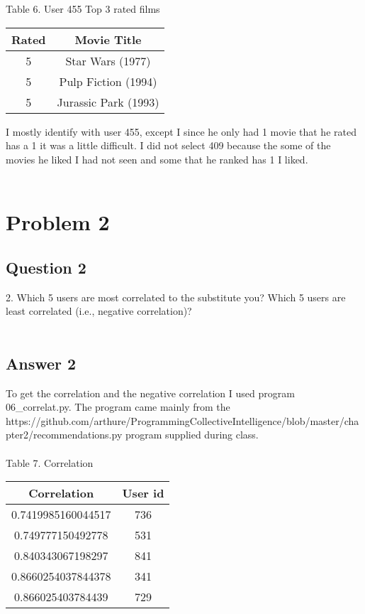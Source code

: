 \documentclass[10pt,letterpaper]{article}
\begin{document}
Table 6. User 455 Top 3 rated films\\
\begin{center}
  \begin{tabular}{ | c | c }
    \hline
     Rated & Movie Title\\ \hline
     5 & Star Wars (1977)\\ \hline
     5 & Pulp Fiction (1994)\\ \hline
     5 & Jurassic Park (1993)\\ \hline
    \hline
  \end{tabular}
\end{center}

I mostly identify with user 455, except I since he only had 1 movie that he rated has a 1 it was a little difficult.  I did not select 409 because the some of the movies he liked I had not seen and some that he ranked has 1 I liked.\\
\\
\pagebreak 
\section{Problem 2}
\subsection{Question 2}
2.  Which 5 users are most correlated to the substitute you? Which 5 users are least correlated (i.e., negative correlation)?\\
\\
\subsection{Answer 2}
To get the correlation and the negative correlation I used program 06\_correlat.py.  The program came mainly from the https://github.com/arthur\-e/Programming\-Collective\-Intelligence/blob/master/chapter2/recommendations.py program supplied during class.\\
\\
Table 7. Correlation\\
\begin{center}
  \begin{tabular}{ | c | c }
    \hline
     Correlation & User id\\ \hline
     0.7419985160044517 & 736\\ \hline
     0.749777150492778  & 531\\ \hline
     0.840343067198297  & 841\\ \hline
     0.8660254037844378 & 341\\ \hline
     0.866025403784439  & 729\\ \hline
    \hline
  \end{tabular}
\end{center}
\end{document}
